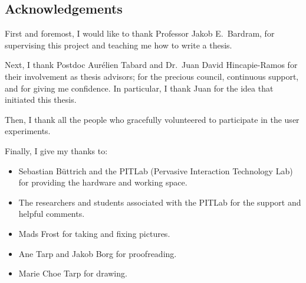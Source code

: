 \documentclass[a4paper,11pt,twoside,onecolumn,openright,final]{memoir}
\begin{document}


\subsection*{Acknowledgements}

First and foremost, I would like to thank Professor Jakob E.\ Bardram, for supervising this project and teaching me how to write a thesis.

Next, I thank Postdoc Aur\'{e}lien Tabard and Dr.\ Juan David Hincapie-Ramos for their involvement as thesis advisors; for the precious council, continuous support, and for giving me confidence.
In particular, I thank Juan for the idea that initiated this thesis.

Then, I thank all the people who gracefully volunteered to participate in the user experiments.

Finally, I give my thanks to:
\tightlists
\begin{itemize}[-]

\item Sebastian B\"{u}ttrich and the PITLab (Pervasive Interaction Technology Lab) for providing the hardware and working space.

\item The researchers and students associated with the PITLab for the support and helpful comments.

\item Mads Frost for taking and fixing pictures.

\item Ane Tarp and Jakob Borg for proofreading.

\item Marie Choe Tarp for drawing.

\end{itemize}

\clearpage

\newpage
\mbox{}
\clearpage

\pagestyle{headings}
\tableofcontents

\clearpage

\firmlists



%















\end{document}
